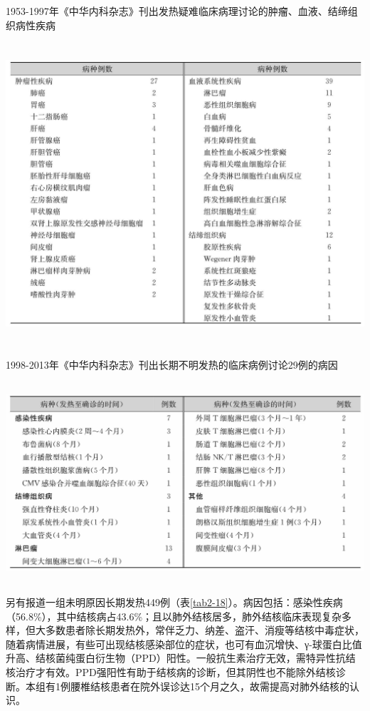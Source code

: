 \begin{table}[htbp]
\centering
\caption{1953-1997年《中华内科杂志》刊出发热疑难临床病理讨论的肿瘤、血液、结缔组织病性疾病}
\label{tab2-16}
\includegraphics[width=5.95833in,height=4.41667in]{./images/Image00022.jpg}
\end{table}

\begin{table}[htbp]
\centering
\caption{1998-2013年《中华内科杂志》刊出长期不明发热的临床病例讨论29例的病因}
\label{tab2-17}
\includegraphics[width=5.95833in,height=2.92708in]{./images/Image00023.jpg}
\end{table}

另有报道一组未明原因长期发热449例（表\ref{tab2-18}）。病因包括：感染性疾病（56.8\%），其中结核病占43.6\%；且以肺外结核居多，肺外结核临床表现复杂多样，但大多数患者除长期发热外，常伴乏力、纳差、盗汗、消瘦等结核中毒症状，随着病情进展，有些可出现结核感染部位的症状，也可有血沉增快、γ-球蛋白比值升高、结核菌纯蛋白衍生物（PPD）阳性。一般抗生素治疗无效，需特异性抗结核治疗才有效。PPD强阳性有助于结核病的诊断，但其阴性也不能除外结核诊断。本组有1例腰椎结核患者在院外误诊达15个月之久，故需提高对肺外结核的认识。

